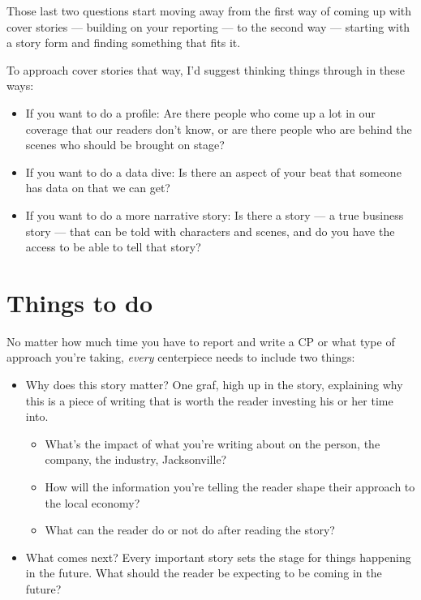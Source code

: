 \documentclass[
  12pt,
  american,
  letterpaperpaper,
  extrafontsizes,onecolumn,openright
  ]{memoir}
\providecommand{\tightlist}{%
  \setlength{\itemsep}{0pt}\setlength{\parskip}{0pt}}
\begin{document}
Those last two questions start moving away from the first way of coming up with cover stories --- building on your reporting --- to the second way --- starting with a story form and finding something that fits it.

To approach cover stories that way, I'd suggest thinking things through in these ways:

\begin{itemize}
\tightlist
\item
  If you want to do a profile: Are there people who come up a lot in our coverage that our readers don't know, or are there people who are behind the scenes who should be brought on stage?
\item
  If you want to do a data dive: Is there an aspect of your beat that someone has data on that we can get?
\item
  If you want to do a more narrative story: Is there a story --- a true business story --- that can be told with characters and scenes, and do you have the access to be able to tell that story?
\end{itemize}

\hypertarget{things-to-do}{%
\section*{Things to do}\label{things-to-do}}

No matter how much time you have to report and write a CP or what type of approach you're taking, \emph{every} centerpiece needs to include two things:

\begin{itemize}
\tightlist
\item
  Why does this story matter? One graf, high up in the story, explaining why this is a piece of writing that is worth the reader investing his or her time into.

  \begin{itemize}
  \tightlist
  \item
    What's the impact of what you're writing about on the person, the company, the industry, Jacksonville?
  \item
    How will the information you're telling the reader shape their approach to the local economy?
  \item
    What can the reader do or not do after reading the story?
  \end{itemize}
\item
  What comes next? Every important story sets the stage for things happening in the future. What should the reader be expecting to be coming in the future?
\end{itemize}
\end{document}
